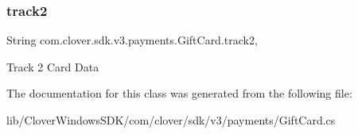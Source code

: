 \subsubsection{\texorpdfstring{track2}{track2}}
{\footnotesize\ttfamily String com.\+clover.\+sdk.\+v3.\+payments.\+Gift\+Card.\+track2\hspace{0.3cm}{\ttfamily [get]}, {\ttfamily [set]}}



Track 2 Card Data 



The documentation for this class was generated from the following file\+:\begin{DoxyCompactItemize}
\item 
lib/\+Clover\+Windows\+S\+D\+K/com/clover/sdk/v3/payments/Gift\+Card.\+cs\end{DoxyCompactItemize}
